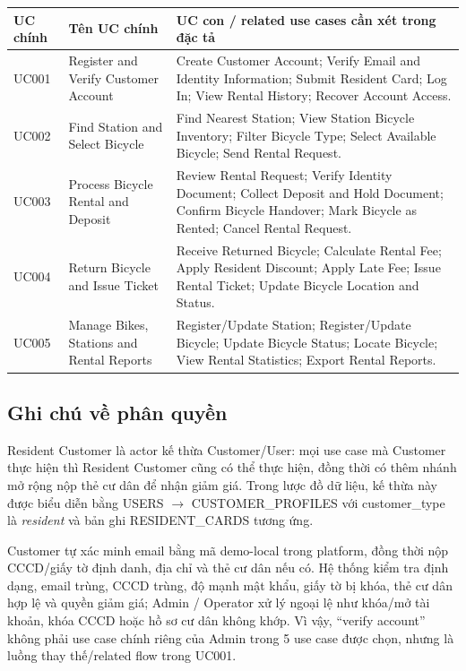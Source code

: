 \begin{longtable}{P{0.14\textwidth}P{0.32\textwidth}P{0.46\textwidth}}
\toprule
\textbf{UC chính} & \textbf{Tên UC chính} & \textbf{UC con / related use cases cần xét trong đặc tả} \\
\midrule
UC001 & Register and Verify Customer Account & Create Customer Account; Verify Email and Identity Information; Submit Resident Card; Log In; View Rental History; Recover Account Access. \\
UC002 & Find Station and Select Bicycle & Find Nearest Station; View Station Bicycle Inventory; Filter Bicycle Type; Select Available Bicycle; Send Rental Request. \\
UC003 & Process Bicycle Rental and Deposit & Review Rental Request; Verify Identity Document; Collect Deposit and Hold Document; Confirm Bicycle Handover; Mark Bicycle as Rented; Cancel Rental Request. \\
UC004 & Return Bicycle and Issue Ticket & Receive Returned Bicycle; Calculate Rental Fee; Apply Resident Discount; Apply Late Fee; Issue Rental Ticket; Update Bicycle Location and Status. \\
UC005 & Manage Bikes, Stations and Rental Reports & Register/Update Station; Register/Update Bicycle; Update Bicycle Status; Locate Bicycle; View Rental Statistics; Export Rental Reports. \\
\bottomrule
\end{longtable}

\subsection{Ghi chú về phân quyền}
Resident Customer là actor kế thừa Customer/User: mọi use case mà Customer thực
hiện thì Resident Customer cũng có thể thực hiện, đồng thời có thêm nhánh mở rộng
nộp thẻ cư dân để nhận giảm giá. Trong lược đồ dữ liệu, kế thừa này được biểu diễn
bằng USERS $\rightarrow$ CUSTOMER\_PROFILES với customer\_type là \textit{resident}
và bản ghi RESIDENT\_CARDS tương ứng.

Customer tự xác minh email bằng mã demo-local trong platform, đồng thời nộp
CCCD/giấy tờ định danh, địa chỉ và thẻ cư dân nếu có. Hệ thống kiểm tra định
dạng, email trùng, CCCD trùng, độ mạnh mật khẩu, giấy tờ bị khóa, thẻ cư dân hợp
lệ và quyền giảm giá; Admin / Operator xử lý ngoại lệ như khóa/mở tài khoản,
khóa CCCD hoặc hồ sơ cư dân không khớp. Vì vậy, ``verify account'' không phải
use case chính riêng của Admin trong 5 use case được chọn, nhưng là luồng thay
thế/related flow trong UC001.

